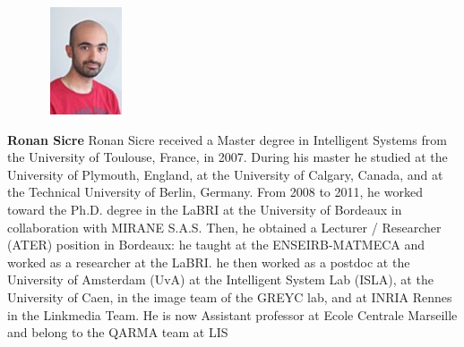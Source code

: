 \documentclass{article}
\begin{document}
\begin{figure}
\includegraphics[width=1in,height=1.25in,clip,keepaspectratio]{author/ronan.jpeg}
\end{figure}\par
\textbf{Ronan Sicre} Ronan Sicre received a Master degree in Intelligent Systems from the University of Toulouse, France, in 2007. During his master he studied at the University of Plymouth, England, at the University of Calgary, Canada, and at the Technical University of Berlin, Germany. From 2008 to 2011, he worked toward the Ph.D. degree in the LaBRI at the University of Bordeaux in collaboration with MIRANE S.A.S. Then, he obtained a Lecturer / Researcher (ATER) position in Bordeaux: he taught at the ENSEIRB-MATMECA and worked as a researcher at the LaBRI. he then worked as a postdoc at the University of Amsterdam (UvA) at the Intelligent System Lab (ISLA), at the University of Caen, in the image team of the GREYC lab, and at INRIA Rennes in the Linkmedia Team. He is now Assistant professor at Ecole Centrale Marseille and belong to the QARMA team at LIS \par
\end{document}
